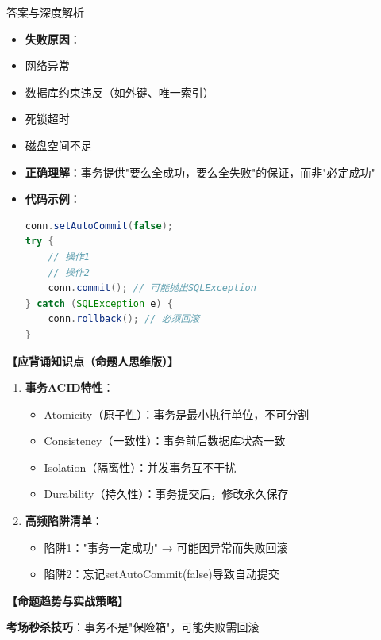 \documentclass[12pt, a4paper]{ctexart}
\begin{document}
\begin{enumerate}[label=\textbf{\arabic*.}]
\begin{bluebox}{答案与深度解析}
\begin{itemize}[label={}, leftmargin=*, nosep]
\begin{itemize}[label={}, nosep]
			      \item \textbf{失败原因}：
				            \item 网络异常
				            \item 数据库约束违反（如外键、唯一索引）
				            \item 死锁超时
				            \item 磁盘空间不足
			      \item \textbf{正确理解}：事务提供"要么全成功，要么全失败"的保证，而非"必定成功"
			      \item \textbf{代码示例}：
			            \begin{lstlisting}[language=Java]
conn.setAutoCommit(false);
try {
    // 操作1
    // 操作2
    conn.commit(); // 可能抛出SQLException
} catch (SQLException e) {
    conn.rollback(); // 必须回滚
}
      \end{lstlisting}
					  \end{itemize}
					  \end{itemize}
\textbf{【应背诵知识点（命题人思维版）】}
		      \begin{enumerate}[label={}, leftmargin=*, nosep]
			      \item \textbf{事务ACID特性}：
			            \begin{itemize}[label={}, nosep]
				            \item Atomicity（原子性）：事务是最小执行单位，不可分割
				            \item Consistency（一致性）：事务前后数据库状态一致
				            \item Isolation（隔离性）：并发事务互不干扰
				            \item Durability（持久性）：事务提交后，修改永久保存
			            \end{itemize}

			      \item \textbf{高频陷阱清单}：
			            \begin{itemize}[label={}, nosep]
				            \item 陷阱1："事务一定成功" → 可能因异常而失败回滚
				            \item 陷阱2：忘记setAutoCommit(false)导致自动提交
			            \end{itemize}
		      \end{enumerate}

		      \textbf{【命题趋势与实战策略】}

		      \textbf{考场秒杀技巧}：事务不是"保险箱"，可能失败需回滚
	      \end{bluebox}

\end{enumerate}
\end{document}
